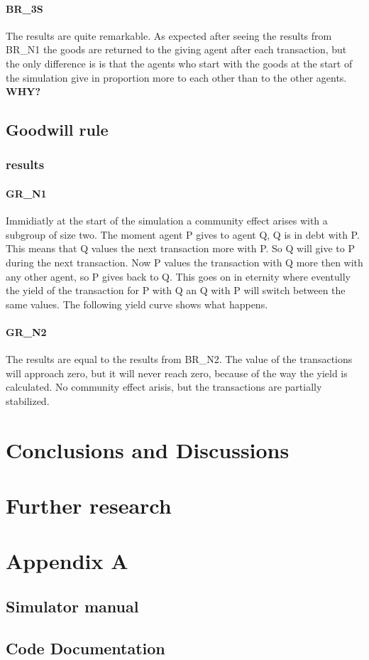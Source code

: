 \documentclass[twoside,openright]{uva-bachelor-thesis}
\begin{document}
\subsubsection{BR\_3S}
The results are quite remarkable. As expected after seeing the results from BR\_N1 the goods are returned to the giving agent after each transaction, but the only difference is is that the agents who start with the goods at the start of the simulation give in proportion more to each other than to the other agents. \textbf{WHY?}

\section{Goodwill rule}

\subsection{results}

\subsubsection{GR\_N1}
Immidiatly at the start of the simulation a community effect arises with a subgroup of size two. The moment agent P gives to agent Q, Q is in debt with P. This means that Q values the next transaction more with P. So Q will give to P during the next transaction. Now P values the transaction with Q more then with any other agent, so P gives back to Q. This goes on in eternity where eventully the yield of the transaction for P with Q an Q with P will switch between the same values. The following yield curve shows what happens. 

\subsubsection{GR\_N2}
The results are equal to the results from BR\_N2. The value of the transactions will approach zero, but it will never reach zero, because of the way the yield is calculated. No community effect arisis, but the transactions are partially stabilized.

\chapter{Conclusions and Discussions}

\chapter{Further research}

\chapter{Appendix A}

\section{Simulator manual}

\section{Code Documentation}
\end{document}
